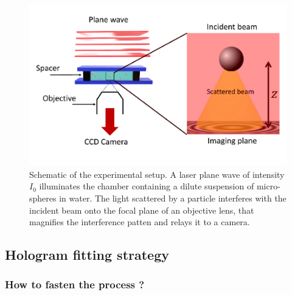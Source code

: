 \begin{figure}[!ht]
	\centering
	\includegraphics[scale=0.9]{02_body/chapter2/images/figures_setup/schema_setup.pdf}
	\caption{Schematic of the experimental setup. A laser plane wave of intensity $I_0$ illuminates the chamber containing a dilute suspension of micro-spheres in water. The light scattered by a particle interferes with the incident beam onto the focal plane of an objective lens, that magnifies the interference patten and relays it to a camera.}
	\label{fig:schema}
\end{figure}


\subsection{Hologram fitting strategy}

\subsubsection{How to fasten the process ?}

